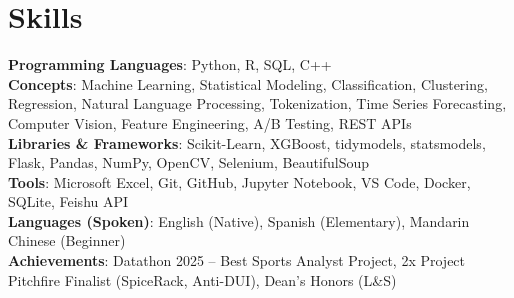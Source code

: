 \documentclass[letterpaper,10pt]{article}
\begin{document}
\section{Skills}
 \begin{itemize}[leftmargin=0.15in, label={}]
    \small{\item{
     \textbf{Programming Languages}{: Python, R, SQL, C++} \\
     \textbf{Concepts}{: Machine Learning, Statistical Modeling, Classification, Clustering, Regression, Natural Language Processing, Tokenization, Time Series Forecasting, Computer Vision, Feature Engineering, A/B Testing, REST APIs} \\
     \textbf{Libraries \& Frameworks}{: Scikit-Learn, XGBoost, tidymodels, statsmodels, Flask, Pandas, NumPy, OpenCV, Selenium, BeautifulSoup} \\
     \textbf{Tools}{: Microsoft Excel, Git, GitHub, Jupyter Notebook, VS Code, Docker, SQLite, Feishu API} \\
     \textbf{Languages (Spoken)}{: English (Native), Spanish (Elementary), Mandarin Chinese (Beginner)} \\
     \textbf{Achievements}{: Datathon 2025 -- Best Sports Analyst Project, 2x Project Pitchfire Finalist (SpiceRack, Anti-DUI), Dean's Honors (L&S)}
    }}
 \end{itemize}
 
\end{document}
